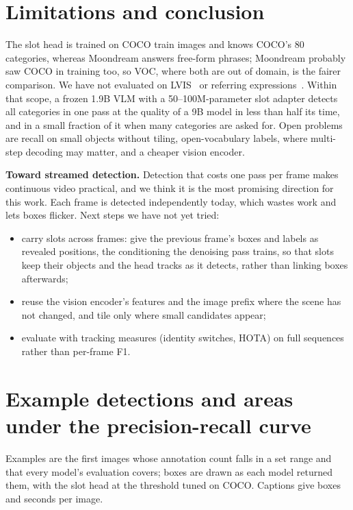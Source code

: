 \documentclass[10pt,twocolumn]{article}
\begin{document}
\section{Limitations and conclusion}
The slot head is trained on COCO train images and knows COCO's 80 categories, whereas
Moondream answers free-form phrases; Moondream probably saw COCO in training too, so
VOC, where both are out of domain, is the fairer comparison. We have not evaluated on
LVIS~\citep{gupta2019lvis} or referring expressions~\citep{yu2016refcoco}. Within that
scope, a frozen 1.9B VLM with a 50--100M-parameter slot adapter detects all categories
in one pass at the quality of a 9B model in less than half its time, and in a small
fraction of it when many categories are asked for. Open problems are recall on small
objects without tiling, open-vocabulary labels, where multi-step decoding may matter,
and a cheaper vision encoder.

\textbf{Toward streamed detection.} Detection that costs one pass per frame makes
continuous video practical, and we think it is the most promising direction for this
work. Each frame is detected independently today, which wastes work and lets boxes
flicker. Next steps we have not yet tried:
\begin{itemize}
\item carry slots across frames: give the previous frame's boxes and labels as revealed
positions, the conditioning the denoising pass trains, so that slots keep their objects
and the head tracks as it detects, rather than linking boxes afterwards;
\item reuse the vision encoder's features and the image prefix where the scene has not
changed, and tile only where small candidates appear;
\item evaluate with tracking measures (identity switches, HOTA) on full sequences rather
than per-frame F1.
\end{itemize}



\clearpage
\onecolumn
\appendix
\section{Example detections and areas under the precision-recall curve}

Examples are the first images whose annotation count falls in a set range and that
every model's evaluation covers; boxes are drawn as each model returned them, with the
slot head at the threshold tuned on COCO. Captions give boxes and seconds per image.
\end{document}

